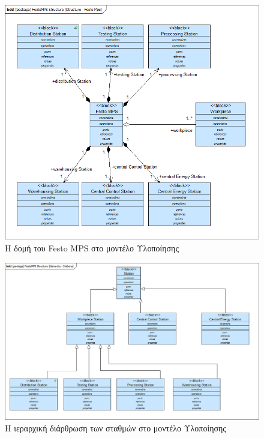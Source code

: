 \documentclass[a4paper,12pt,twoside]{report}
\begin{document}
\begin{appendices}
				\begin{figure}[hp]
					\centering
					\includegraphics[scale=0.50]{DesignModel_Structure-FestoMps.png}
					\caption{Η δομή του Festo MPS στο μοντέλο Υλοποίησης}
					\label{φωτ:Η δομή του Festo MPS στο μοντέλο Υλοποίησης}
				\end{figure}
				
				\begin{figure}[hp]
					\centering
					\includegraphics[scale=0.30]{DesignModel_Hierarchy-Stations.png}
					\caption{Η ιεραρχική διάρθρωση των σταθμών στο μοντέλο Υλοποίησης}
					\label{φωτ:Η ιεραρχική διάρθρωση των σταθμών στο μοντέλο Υλοποίησης}
				\end{figure}
				

\end{appendices}
\end{document}
